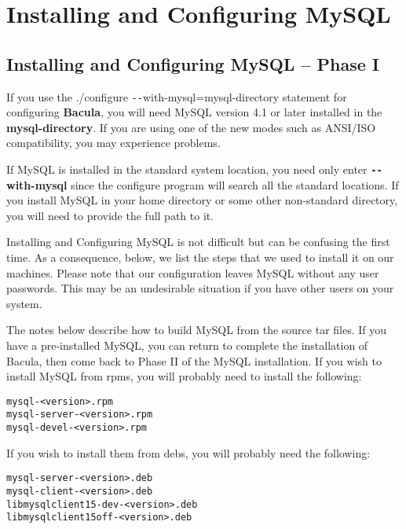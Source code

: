 
\chapter{Installing and Configuring MySQL}
\label{MySqlChapter}

\section{Installing and Configuring MySQL -- Phase I}

If you use the ./configure \verb:--:with-mysql=mysql-directory statement for
configuring {\bf Bacula}, you will need MySQL version 4.1 or later installed
in the {\bf mysql-directory}.  If you are using one of the new modes such as
ANSI/ISO compatibility, you may experience problems.

If MySQL is installed in the standard system location, you need only enter
{\bf \verb:--:with-mysql} since the configure program will search all the
standard locations.  If you install MySQL in your home directory or some
other non-standard directory, you will need to provide the full path to it.

Installing and Configuring MySQL is not difficult but can be confusing the
first time. As a consequence, below, we list the steps that we used to install
it on our machines. Please note that our configuration leaves MySQL without
any user passwords. This may be an undesirable situation if you have other
users on your system. 

The notes below describe how to build MySQL from the source tar files. If
you have a pre-installed MySQL, you can return to complete the installation
of Bacula, then come back to Phase II of the MySQL installation.  If you
wish to install MySQL from rpms, you will probably need to install
the following:

\footnotesize
\begin{verbatim}
mysql-<version>.rpm
mysql-server-<version>.rpm
mysql-devel-<version>.rpm
\end{verbatim}
\normalsize

If you wish to install them from debs, you will probably need the
following:

\footnotesize
\begin{verbatim}
mysql-server-<version>.deb
mysql-client-<version>.deb
libmysqlclient15-dev-<version>.deb
libmysqlclient15off-<version>.deb
\end{verbatim}
\normalsize

